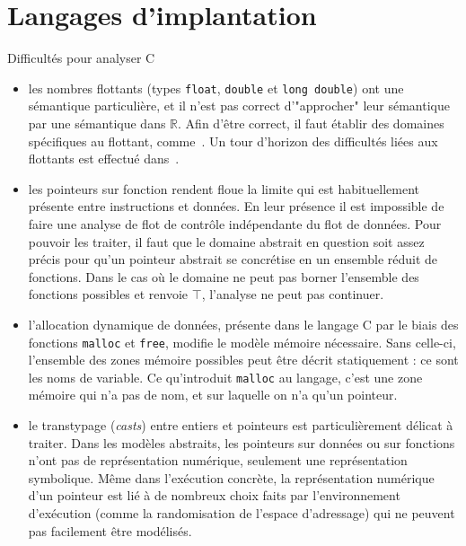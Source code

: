 
\section{Langages d'implantation}




Difficultés pour analyser C

\begin{itemize}
\item les nombres flottants
(types \texttt{float}, \texttt{double} et \texttt{long double}) ont une
sémantique particulière, et il n'est pas correct d'"approcher" leur sémantique
par une sémantique dans $ℝ$. Afin d'être correct, il faut établir des domaines
spécifiques au flottant, comme~\cite{floatpoly}. Un tour d'horizon des
difficultés liées aux flottants est effectué dans~\cite{floatpitfalls}.

\item les pointeurs sur fonction
rendent floue la limite qui est habituellement présente entre instructions et
données. En leur présence il est impossible de faire une analyse de flot de
contrôle indépendante du flot de données. Pour pouvoir les traiter, il faut que
le domaine abstrait en question soit assez précis pour qu'un pointeur abstrait
se concrétise en un ensemble réduit de fonctions. Dans le cas où le domaine ne
peut pas borner l'ensemble des fonctions possibles et renvoie $\top$, l'analyse
ne peut pas continuer.

\item l'allocation dynamique
de données, présente dans le langage C par le biais des fonctions
\texttt{malloc} et \texttt{free}, modifie le modèle mémoire
nécessaire. Sans celle-ci, l'ensemble des zones mémoire possibles peut être
décrit statiquement : ce sont les noms de variable. Ce qu'introduit
\texttt{malloc} au langage, c'est une zone mémoire qui n'a pas de nom, et sur
laquelle on n'a qu'un pointeur.


\item le transtypage (\emph{casts}) entre entiers et pointeurs
est particulièrement délicat à traiter. Dans les modèles abstraits, les
pointeurs sur données ou sur fonctions n'ont pas de représentation numérique,
seulement une représentation symbolique. Même dans l'exécution concrète, la
représentation numérique d'un pointeur est lié à de nombreux choix faits par
l'environnement d'exécution (comme la randomisation de l'espace d'adressage) qui
ne peuvent pas facilement être modélisés.

\end{itemize}

